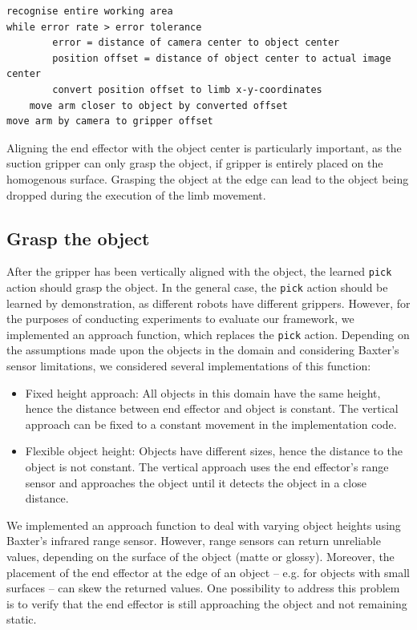 \begin{verbatim}
recognise entire working area
while error rate > error tolerance
        error = distance of camera center to object center
        position offset = distance of object center to actual image center
        convert position offset to limb x-y-coordinates
	move arm closer to object by converted offset
move arm by camera to gripper offset
\end{verbatim}
Aligning the end effector with the object center is particularly important, as the suction gripper can only grasp the object, if gripper is entirely placed on the homogenous surface. Grasping the object at the edge can lead to the object being dropped during the execution of the limb movement.

\subsection{Grasp the object}
After the gripper has been vertically aligned with the object, the learned \texttt{pick} action should grasp the object. In the general case, the \texttt{pick} action should be learned by demonstration, as different robots have different grippers. However, for the purposes of conducting experiments to evaluate our framework, we implemented an approach function, which replaces the \texttt{pick} action. Depending on the assumptions made upon the objects in the domain and considering Baxter's sensor limitations, we considered several implementations of this function:
\begin{itemize}
\item Fixed height approach: All objects in this domain have the same height, hence the distance between end effector and object is constant. The vertical approach can be fixed to a constant movement in the implementation code.
\item Flexible object height: Objects have different sizes, hence the distance to the object is not constant. The vertical approach uses the end effector's range sensor and approaches the object until it detects the object in a close distance.
\end{itemize}
We implemented an approach function to deal with varying object heights using Baxter's infrared range sensor. However, range sensors can return unreliable values, depending on the surface of the object (matte or glossy). Moreover, the placement of the end effector at the edge of an object -- e.g. for objects with small surfaces -- can skew the returned values. One possibility to address this problem is to verify that the end effector is still approaching the object and not remaining static.


